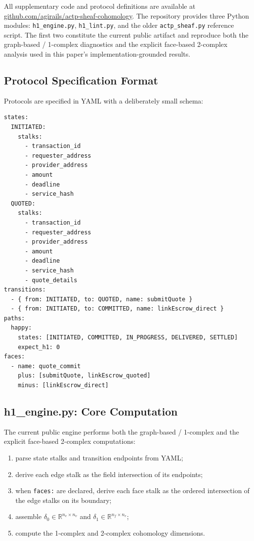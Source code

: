 \documentclass[11pt]{article}
\theoremstyle{plain}
\theoremstyle{definition}
\newcommand{\deltazero}{\delta_{0}}
\newcommand{\deltaone}{\delta_{1}}
\newcommand{\RR}{\mathbb{R}}
\begin{document}
All supplementary code and protocol definitions are available at
\href{https://github.com/agirails/actp-sheaf-cohomology}%
     {github.com/agirails/\allowbreak actp-sheaf-cohomology}.
The repository provides three Python modules:
\texttt{h1\_engine.py}, \texttt{h1\_lint.py}, and the older
\texttt{actp\_sheaf.py} reference script.  The first two constitute the
current public artifact and reproduce both the graph-based / 1-complex
diagnostics and the explicit face-based 2-complex analysis used in this
paper's implementation-grounded results.

\subsection{Protocol Specification Format}

Protocols are specified in YAML with a deliberately small schema:

\begin{lstlisting}[caption={Excerpt of \texttt{protocol.yaml} for ACTP v2.7.}]
states:
  INITIATED:
    stalks:
      - transaction_id
      - requester_address
      - provider_address
      - amount
      - deadline
      - service_hash
  QUOTED:
    stalks:
      - transaction_id
      - requester_address
      - provider_address
      - amount
      - deadline
      - service_hash
      - quote_details
transitions:
  - { from: INITIATED, to: QUOTED, name: submitQuote }
  - { from: INITIATED, to: COMMITTED, name: linkEscrow_direct }
paths:
  happy:
    states: [INITIATED, COMMITTED, IN_PROGRESS, DELIVERED, SETTLED]
    expect_h1: 0
faces:
  - name: quote_commit
    plus: [submitQuote, linkEscrow_quoted]
    minus: [linkEscrow_direct]
\end{lstlisting}

\subsection{h1\_engine.py: Core Computation}

The current public engine performs both the graph-based / 1-complex and the
explicit face-based 2-complex computations:
\begin{enumerate}
  \item parse state stalks and transition endpoints from YAML;
  \item derive each edge stalk as the field intersection of its endpoints;
  \item when \texttt{faces:} are declared, derive each face stalk as the
        ordered intersection of the edge stalks on its boundary;
  \item assemble $\deltazero \in \RR^{n_e \times n_v}$ and
        $\deltaone \in \RR^{n_f \times n_e}$;
  \item compute the 1-complex and 2-complex cohomology dimensions.
\end{enumerate}
\end{document}
